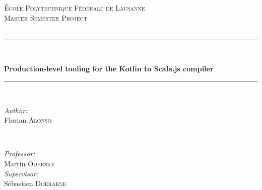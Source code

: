 \begin{titlepage}

\newcommand{\HRule}{\rule{\linewidth}{0.5mm}}

\center %
 

\textsc{\LARGE École Polytechnique Fédérale de Lausanne}\\[1.5cm]
\textsc{\Large Master Semester Project}\\[0.5cm]
\textsc{}\\[0.5cm] %



\HRule \\[0.4cm]
\begin{spacing}{2}
{\huge \bfseries Production-level tooling for the Kotlin to Scala.js compiler}
\end{spacing}
\HRule \\[1.5cm]
 

\begin{minipage}{0.4\textwidth}
  \begin{flushleft} \large
  \emph{Author:}\\
  Florian \textsc{Alonso} %
  \bigskip \bigskip \bigskip \bigskip
  \end{flushleft}
\end{minipage}
~
\begin{minipage}{0.4\textwidth}
  \begin{flushright} \large
  \emph{Professor:}\\
  Martin \textsc{Odersky}\\
  \bigskip
  \emph{Supervisor:} \\
  Sébastien \textsc{Doeraene} %
  \end{flushright}
\end{minipage}\\[2cm]


\end{titlepage}
